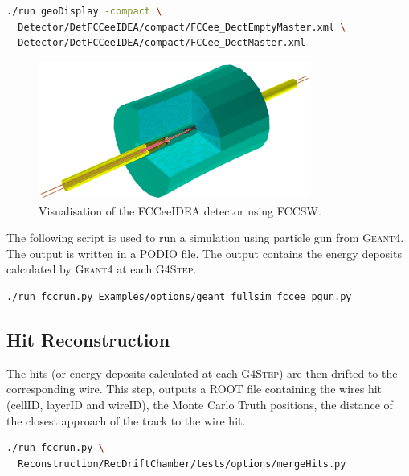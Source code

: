 \begin{lstlisting}[language=bash,caption={Visualise the full geometry of the FCCeeIDEA detector.}]
./run geoDisplay -compact \
  Detector/DetFCCeeIDEA/compact/FCCee_DectEmptyMaster.xml \
  Detector/DetFCCeeIDEA/compact/FCCee_DectMaster.xml
\end{lstlisting}

\begin{figure}[!t]
\centering
\includegraphics[width=0.8\textwidth]{figures/FCCeeIDEA_IR}

\caption{Visualisation of the FCCeeIDEA detector using FCCSW.}
\label{fig_sim_vis}
\end{figure}

The following script is used to run a simulation using particle gun from \textsc{Geant4}. The output is written in a PODIO file. The output contains the energy deposits calculated by \textsc{Geant4} at each \textsc{G4Step}.

\begin{lstlisting}[language=bash,caption={Particle gun simulation.}]
./run fccrun.py Examples/options/geant_fullsim_fccee_pgun.py
\end{lstlisting}

\subsection{Hit Reconstruction}

The hits (or energy deposits calculated at each \textsc{G4Step}) are then drifted to the corresponding wire. This step, outputs a ROOT file containing the wires hit (cellID, layerID and wireID), the Monte Carlo Truth positions, the distance of the closest approach of the track to the wire hit.

\begin{lstlisting}[language=bash,caption={Reconstruction of the simulated hits for the drift chamber.}]
  ./run fccrun.py \
  Reconstruction/RecDriftChamber/tests/options/mergeHits.py
\end{lstlisting}

